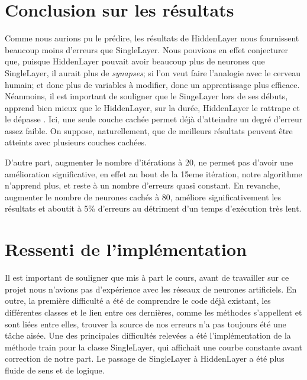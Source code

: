 \documentclass[11pt]{article}
\begin{document}
\section{Conclusion sur les résultats}

Comme nous aurions pu le prédire, les résultats de HiddenLayer nous fournissent beaucoup moins d’erreurs que SingleLayer. Nous pouvions en effet conjecturer que, puisque HiddenLayer pouvait avoir beaucoup plus de neurones que SingleLayer, il aurait plus de \textit{synapses}; si l’on veut faire l’analogie avec le cerveau humain; et donc plus de variables à modifier, donc un apprentissage plus efficace. \newline
Néanmoins, il est important de souligner que le SingeLayer lors de ses débuts, apprend bien mieux que le HiddenLayer, sur la durée, HiddenLayer le rattrape et le dépasse . \newline
Ici, une seule couche cachée permet déjà d’atteindre un degré d’erreur assez faible. On suppose, naturellement, que de meilleurs résultats peuvent être atteints avec plusieurs couches cachées. 

D'autre part, augmenter le nombre d'itérations à 20, ne permet pas d'avoir une amélioration significative, en effet au bout de la 15eme itération, notre algorithme n'apprend plus, et reste à un nombre d'erreurs quasi constant. En revanche, augmenter le nombre de neurones cachés à 80, améliore significativement les résultats et aboutit à 5\% d'erreurs au détriment d'un temps d'exécution très lent.





\section{Ressenti de l'implémentation}

Il est important de souligner que mis à part le cours, avant de travailler sur ce projet nous n’avions pas d’expérience avec les réseaux de neurones artificiels. \newline
En outre, la première difficulté a été de comprendre le code déjà existant, les différentes classes et le lien entre ces dernières, comme les méthodes s'appellent et sont liées entre elles, trouver la source de nos erreurs n'a pas toujours été une tâche aisée.  \newline 
Une des principales difficultés relevées a été l’implémentation de la méthode train pour la classe SingleLayer, qui affichait une courbe constante avant correction de notre part. Le passage de SingleLayer à HiddenLayer a été plus fluide de sens et de logique. \newline
\end{document}
